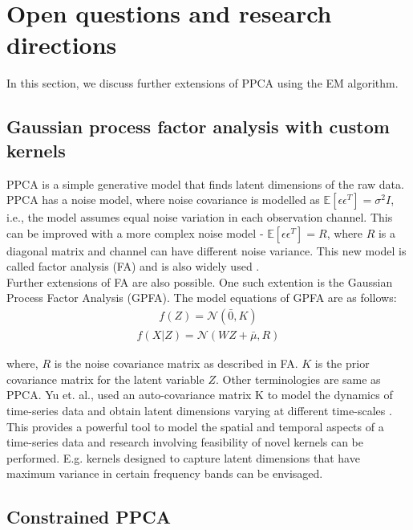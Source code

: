 

\section{Open questions and research directions}

In this section, we discuss further extensions of PPCA using the EM algorithm. 

\subsection{Gaussian process factor analysis with custom kernels}	

PPCA is a simple generative model that finds latent dimensions of the raw data. PPCA has a noise model, where noise covariance is modelled as $\mathbb{E}[\epsilon \epsilon^T] = \sigma^2I$, i.e., the model assumes equal noise variation in each observation channel. This can be improved with a more complex noise model - $\mathbb{E}[\epsilon \epsilon^T] = R$, where $R$ is a diagonal matrix and channel can have different noise variance. This new model is called factor analysis (FA) and is also widely used \cite{harman1976modern, rummel1988applied}. \\

Further extensions of FA are also possible. One such extention is the Gaussian Process Factor Analysis (GPFA). The model equations of GPFA are as follows: 
\begin{align*}
	f(Z) = \mathcal{N}(\bar{0}, K) 
\end{align*} 
\begin{align*}
	f(X|Z) = \mathcal{N}(WZ + \bar{\mu}, R) 
\end{align*} 

where, $R$ is the noise covariance matrix as described in FA. $K$ is the prior covariance matrix for the latent variable $Z$. Other terminologies are same as PPCA. Yu et. al., used an auto-covariance matrix K to model the dynamics of time-series data and obtain latent dimensions varying at different time-scales \cite{yu2008gaussian}. This provides a powerful tool to model the spatial and temporal aspects of a time-series data and research involving feasibility of novel kernels can be performed. E.g. kernels designed to capture latent dimensions that have maximum variance in certain frequency bands can be envisaged. 


\subsection{Constrained PPCA}


